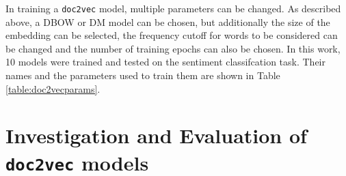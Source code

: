 \documentclass[twocolumn]{article}
\begin{document}
In training a \texttt{doc2vec} model, multiple parameters can be changed. As described above, a DBOW or DM model can be chosen, but additionally the size of the embedding can be selected, the frequency cutoff for words to be considered can be changed and the number of training epochs can also be chosen. In this work, 10 models were trained and tested on the sentiment classifcation task. Their names and the parameters used to train them are shown in Table \ref{table:doc2vecparams}.

\section{Investigation and Evaluation of \texttt{doc2vec} models}

\end{document}
